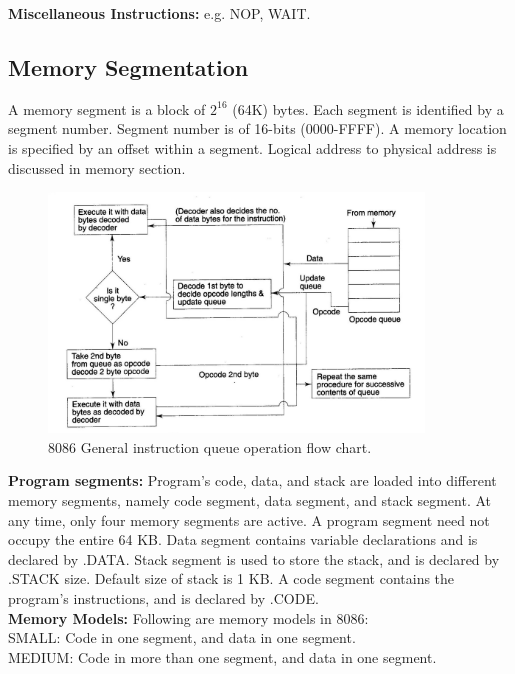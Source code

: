 \documentclass[12pt, a4paper]{scrartcl}
\begin{document}
	\textbf{Miscellaneous Instructions: }e.g. NOP, WAIT.

	\subsection{Memory Segmentation} A memory segment is a block of $2^{16}$ (64K) bytes. Each segment is identified by a segment number. Segment number is of 16-bits (0000-FFFF). A memory location is specified by an offset within a segment. Logical address to physical address is discussed in memory section.\\

	\begin{figure}[h]
		\centering
		\includegraphics[width=0.89\textwidth]{images/8086-instruction-queue-operation.png}
		\caption{8086 General instruction queue operation flow chart.}
		\label{image-16}
	\end{figure}

	\textbf{Program segments: }Program's code, data, and stack are loaded into different memory segments, namely code segment, data segment, and stack segment. At any time, only four memory segments are active. A program segment need not occupy the entire 64 KB. Data segment contains variable declarations and is declared by .DATA. Stack segment is used to store the stack, and is declared by .STACK size. Default size of stack is 1 KB. A code segment contains the program's instructions, and is declared by .CODE.\\

	\textbf{Memory Models: }Following are memory models in 8086:\\

	SMALL: Code in one segment, and data in one segment.\\

	MEDIUM: Code in more than one segment, and data in one segment.\\
\end{document}
